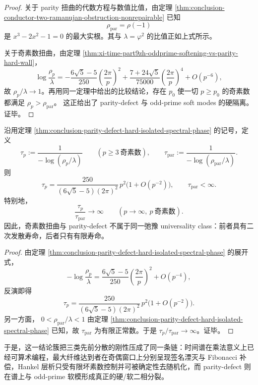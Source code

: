 \begin{proof}
关于 parity 扭曲的代数方程与数值比值，由定理 \ref{thm:conclusion-conductor-two-ramanujan-obstruction-nonrepairable} 已知
\[
\rho_{\mathrm{par}}=\rho(-1)
\]
是
\(
x^3-2x^2-1=0
\)
的最大实根。其与 \(\lambda=\varphi^2\) 的比值正如上式所示。

关于奇素数扭曲，由定理 \ref{thm:xi-time-part9zh-oddprime-softening-vs-parity-hard-wall}，
\[
\log\frac{\rho_p}{\lambda}
=
-\frac{6\sqrt5-5}{250}\left(\frac{2\pi}{p}\right)^2
+\frac{7+24\sqrt5}{75000}\left(\frac{2\pi}{p}\right)^4
+O(p^{-6}),
\]
故 \(\rho_p/\lambda\to 1\)。再用同一定理中给出的比较结论，存在 \(p_0\) 使一切 \(p\ge p_0\) 的奇素数都满足
\(
\rho_p>\rho_{\mathrm{par}}
\)。
这正给出了 parity-defect 与 odd-prime soft modes 的硬隔离。证毕。
\end{proof}

\begin{corollary}\label{cor:conclusion-oddprime-p2-relaxation-vs-parity-lifetime}
沿用定理 \ref{thm:conclusion-parity-defect-hard-isolated-spectral-phase} 的记号，定义
\[
\tau_p:=\frac{1}{-\log(\rho_p/\lambda)}
\qquad
(p\ge 3\ \text{奇素数}),
\qquad
\tau_{\mathrm{par}}:=\frac{1}{-\log(\rho_{\mathrm{par}}/\lambda)}.
\]
则
\[
\tau_p=
\frac{250}{(6\sqrt5-5)(2\pi)^2}\,p^2\bigl(1+O(p^{-2})\bigr),
\qquad
\tau_{\mathrm{par}}<\infty.
\]
特别地，
\[
\frac{\tau_p}{\tau_{\mathrm{par}}}\to\infty
\qquad
(p\to\infty,\ p\ \text{奇素数}).
\]
因此，奇素数扭曲与 parity-defect 不属于同一弛豫 universality class：前者具有二次发散寿命，后者只有有限寿命。
\end{corollary}

\begin{proof}
由定理 \ref{thm:conclusion-parity-defect-hard-isolated-spectral-phase} 的展开式，
\[
-\log\frac{\rho_p}{\lambda}
=
\frac{6\sqrt5-5}{250}\left(\frac{2\pi}{p}\right)^2
+O(p^{-4}),
\]
反演即得
\[
\tau_p=
\frac{250}{(6\sqrt5-5)(2\pi)^2}\,p^2\bigl(1+O(p^{-2})\bigr).
\]
另一方面，
\(
0<\rho_{\mathrm{par}}/\lambda<1
\)
由定理 \ref{thm:conclusion-parity-defect-hard-isolated-spectral-phase} 已知，故 \(\tau_{\mathrm{par}}\) 为有限正常数。于是 \(\tau_p/\tau_{\mathrm{par}}\to\infty\)。证毕。
\end{proof}

\noindent
于是，这一结论簇把三类先前分散的刚性压成了同一条链：时间谱在乘法意义上已经可算术编程，最大纤维达到者在奇偶窗口上分别呈现签名湮灭与 Fibonacci 补偿，Hankel 层析只受有限坏素数控制并可被确定性去随机化，而 parity-defect 则在谱上与 odd-prime 软模形成真正的硬/软二相分裂。
